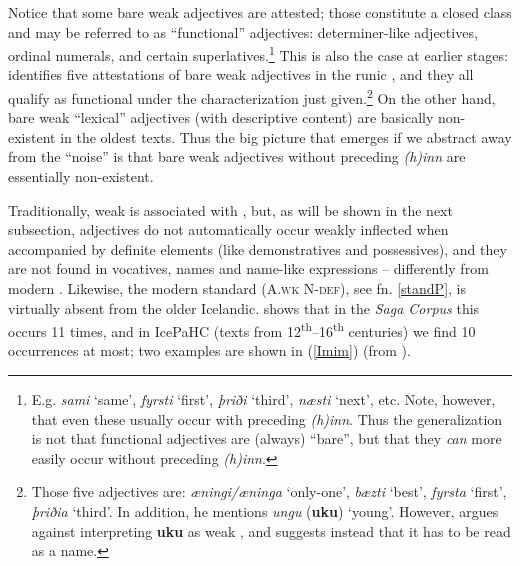 \documentclass[output=paper,colorlinks,citecolor=brown]{langscibook}
\begin{document}
Notice that some bare weak adjectives  are attested; those constitute a closed class and may be referred to as ``functional'' adjectives: determiner-like adjectives, ordinal numerals, and certain superlatives.\footnote{E.g. \textit{sami} `same', \textit{fyrsti} `first', \textit{þriði} `third', \textit{næsti} `next', etc. Note, however, that even these usually occur with preceding \textit{(h)inn}. Thus the generalization is not that functional adjectives are (always) ``bare'', but that they \textit{can} more easily occur without preceding \textit{(h)inn}.}
  This is also the case at earlier stages: \citet{Perridon96} identifies five attestations of bare weak adjectives in the runic , and they all qualify as functional under the characterization just given.\footnote{Those five adjectives are: \textit{æningi/æninga} `only-one', \textit{bæzti} `best', \textit{fyrsta} `first', \textit{þriðia} `third'. In addition, he mentions \textit{ungu} (\textbf{uku}) `young'. However, \citet{Ulla2012}  argues against interpreting \textbf{uku} as weak , and suggests instead that it has to be read as a name.}    On the other hand, bare weak ``lexical'' adjectives (with descriptive content) are basically non-existent in the oldest texts. Thus the big picture that emerges if we abstract away from the ``noise'' is that bare weak adjectives without  preceding \textit{(h)inn}  are essentially non-existent. 

Traditionally, weak  is associated with , but, as will be shown in the next subsection, adjectives do not automatically occur weakly inflected when accompanied by  definite elements (like demonstratives and possessives), and they are not found in vocatives, names and name-like expressions -- differently from modern . Likewise, the modern  standard  (\textsc{A.wk N-def}), see fn. \ref{standP}, is virtually absent from the older Icelandic. \citet[179--184]{Pfaff2019} shows that in the \textit{Saga Corpus} this  occurs 11 times, and in IcePaHC (texts from 12\textsuperscript{th}--16\textsuperscript{th} centuries) we find 10 occurrences at most; two examples are shown in (\ref{Imim}) (from \citealt[180]{Pfaff2019}).
\end{document}
